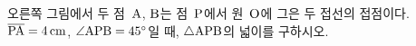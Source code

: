 \noindent\begin{minipage}[t]{0.58\linewidth}\vspace{0pt}\raggedright 오른쪽 그림에서 두 점~$\mathrm{A}$, $\mathrm{B}$는 점~$\mathrm{P}$에서 원~$\mathrm{O}$에 그은 두 접선의 접점이다. $\overline{\mathrm{PA}}=4\,\mathrm{cm}$, $\angle\mathrm{APB}=45^\circ$일 때, $\triangle\mathrm{APB}$의 넓이를 구하시오.\end{minipage}\hfill\begin{minipage}[t]{0.4\linewidth}\vspace{0pt}\centering \resizebox{\ifdim\width>\linewidth\linewidth\else\width\fi}{!}{}\end{minipage}\par
